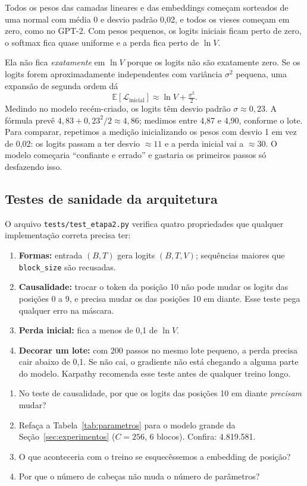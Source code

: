 \documentclass[11pt,a4paper]{article}
\newcommand{\E}{\mathbb{E}}
\begin{document}
Todos os pesos das camadas lineares e das embeddings começam sorteados de uma normal com média 0 e desvio padrão 0,02, e todos os vieses começam em zero, como no GPT-2. Com pesos pequenos, os logits iniciais ficam perto de zero, o softmax fica quase uniforme e a perda fica perto de $\ln V$.

Ela não fica \emph{exatamente} em $\ln V$ porque os logits não são exatamente zero. Se os logits forem aproximadamente independentes com variância $\sigma^2$ pequena, uma expansão de segunda ordem dá
\[
\E[\mathcal{L}_{\text{inicial}}] \approx \ln V + \tfrac{\sigma^2}{2}.
\]
Medindo no modelo recém-criado, os logits têm desvio padrão $\sigma \approx 0{,}23$. A fórmula prevê $4{,}83 + 0{,}23^2/2 \approx 4{,}86$; medimos entre 4,87 e 4,90, conforme o lote. Para comparar, repetimos a medição inicializando os pesos com desvio 1 em vez de 0,02: os logits passam a ter desvio $\approx 11$ e a perda inicial vai a $\approx 30$. O modelo começaria ``confiante e errado'' e gastaria os primeiros passos só desfazendo isso.

\subsection{Testes de sanidade da arquitetura}

O arquivo \texttt{tests/test\_etapa2.py} verifica quatro propriedades que qualquer implementação correta precisa ter:

\begin{enumerate}
\item \textbf{Formas:} entrada $(B,T)$ gera logits $(B,T,V)$; sequências maiores que \texttt{block\_size} são recusadas.
\item \textbf{Causalidade:} trocar o token da posição 10 não pode mudar os logits das posições 0 a 9, e precisa mudar os das posições 10 em diante. Esse teste pega qualquer erro na máscara.
\item \textbf{Perda inicial:} fica a menos de 0,1 de $\ln V$.
\item \textbf{Decorar um lote:} com 200 passos no mesmo lote pequeno, a perda precisa cair abaixo de 0,1. Se não cai, o gradiente não está chegando a alguma parte do modelo. Karpathy \cite{karpathy} recomenda esse teste antes de qualquer treino longo.
\end{enumerate}

\begin{exercicios}
\begin{enumerate}
\item No teste de causalidade, por que os logits das posições 10 em diante \emph{precisam} mudar?
\item Refaça a Tabela~\ref{tab:parametros} para o modelo grande da Seção~\ref{sec:experimentos} ($C=256$, 6 blocos). Confira: 4.819.581.
\item O que aconteceria com o treino se esquecêssemos a embedding de posição?
\item Por que o número de cabeças não muda o número de parâmetros?
\end{enumerate}
\end{exercicios}
\end{document}
